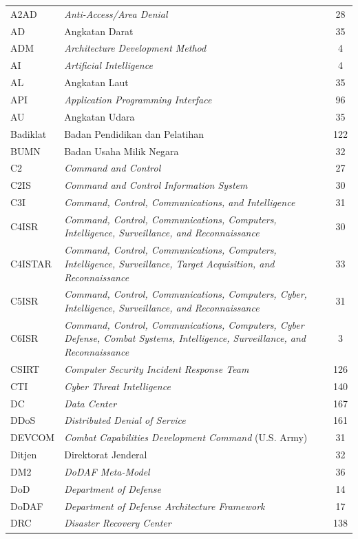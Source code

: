 \begin{longtable}{@{} l >{\raggedright\arraybackslash}p{7.5cm} c @{}}
A2AD & \textit{Anti-Access/Area Denial} & 28 \\
AD & Angkatan Darat & 35 \\
ADM & \textit{Architecture Development Method} & 4 \\
AI & \textit{Artificial Intelligence} & 4 \\
AL & Angkatan Laut & 35 \\
API & \textit{Application Programming Interface} & 96 \\
AU & Angkatan Udara & 35 \\
Badiklat & Badan Pendidikan dan Pelatihan & 122 \\
BUMN & Badan Usaha Milik Negara & 32 \\
C2 & \textit{Command and Control} & 27 \\
C2IS & \textit{Command and Control Information System} & 30 \\
C3I & \textit{Command, Control, Communications, and Intelligence} & 31 \\
C4ISR & \textit{Command, Control, Communications, Computers, Intelligence, Surveillance, and Reconnaissance} & 30 \\
C4ISTAR & \textit{Command, Control, Communications, Computers, Intelligence, Surveillance, Target Acquisition, and Reconnaissance} & 33 \\
C5ISR & \textit{Command, Control, Communications, Computers, Cyber, Intelligence, Surveillance, and Reconnaissance} & 31 \\
C6ISR & \textit{Command, Control, Communications, Computers, Cyber Defense, Combat Systems, Intelligence, Surveillance, and Reconnaissance} & 3 \\
CSIRT & \textit{Computer Security Incident Response Team} & 126 \\
CTI & \textit{Cyber Threat Intelligence} & 140 \\
DC & \textit{Data Center} & 167 \\
DDoS & \textit{Distributed Denial of Service} & 161 \\
DEVCOM & \textit{Combat Capabilities Development Command} (U.S. Army) & 31 \\
Ditjen & Direktorat Jenderal & 32 \\
DM2 & \textit{DoDAF Meta-Model} & 36 \\
DoD & \textit{Department of Defense} & 14 \\
DoDAF & \textit{Department of Defense Architecture Framework} & 17 \\
DRC & \textit{Disaster Recovery Center} & 138 \\

\end{longtable}
